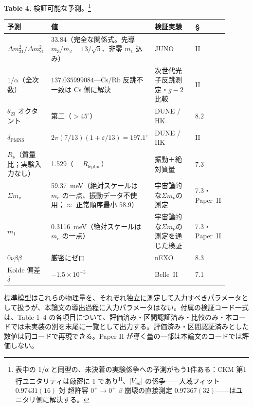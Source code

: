 \documentclass[fontsize=11pt,paper=a4,lualatex]{jlreq}
\newcommand{\PII}{\textsuperscript{\textup{II}}}
\begin{document}
\bigskip
\begin{center}\textbf{Table 4.} 検証可能な予測。\footnote{表中の 1/α と同型の、未決着の実験係争への予測がもう1件ある：CKM 第1行ユニタリティは厳密に 1 であり\PII{}、$|V_{ud}|$ の係争——大域フィット $0.97431(16)$ 対 超許容 $0^+\to0^+$ $\beta$ 崩壊の直接測定 $0.97367(32)$——はユニタリ側に解決する。}\end{center}
\nopagebreak[4]\smallskip\nopagebreak[4]
\begin{center}\footnotesize
\begin{tabular}{@{}p{0.18\linewidth}p{0.34\linewidth}p{0.29\linewidth}p{0.09\linewidth}@{}}
\toprule
予測 & 値 & 検証実験 & \S \\
\midrule
$\Delta m^2_{31}/\Delta m^2_{21}$ & $33.84$（完全な関係式。先導 $m_3/m_2 = 13/\sqrt{5}$、非零 $m_1$ 込み） & JUNO~\cite{juno} & II \\
$1/\alpha$（全次数） & $137.035999084$---Cs/Rb 反跳不一致は Cs 側に解決 & 次世代光子反跳測定・$g{-}2$ 比較 & II \\
$\theta_{23}$ オクタント & 第二（$>45^\circ$） & DUNE / HK & 8.2 \\
$\delta_\mathrm{PMNS}$ & $2\pi(7/13)(1+\varepsilon/13) = 197.1^\circ$ & DUNE / HK & II \\
$R_\nu$（質量比；実験入力なし） & 1.529（$= R_\mathrm{lepton}$） & 振動＋絶対質量 & 7.3 \\
$\Sigma m_\nu$ & 59.37~meV（絶対スケールは $m_e$ の一点、振動データ不使用；$\approx$ 正常順序最小 58.9） & 宇宙論的な$\Sigma m_\nu$の測定\footnotemark{} & 7.3・Paper~II \\
$m_1$ & 0.3116~meV（絶対スケールは $m_e$ の一点） & 宇宙論的な$\Sigma m_\nu$の測定を通じた検証 & 7.3・Paper~II \\
$0\nu\beta\beta$ & 厳密にゼロ & nEXO~\cite{nexo} & 8.3 \\
Koide 偏差 $\delta$ & $-1.5 \times 10^{-5}$ & Belle~II~\cite{belleii} & 7.1 \\
\bottomrule
\end{tabular}
\end{center}

\bigskip

標準模型はこれらの物理量を、それぞれ独立に測定して入力すべきパラメータとして扱うが、本論文の導出過程に入力パラメータはない。付属の検証コード一式は、Table 1–4 の各項目について、評価済み・区間認証済み・比較のみ・本コードでは未実装の別を末尾に一覧として出力する。評価済み・区間認証済みとした数値は同コードで再現できる。Paper II が導く量の一部は本論文のコードでは評価しない。
\end{document}
